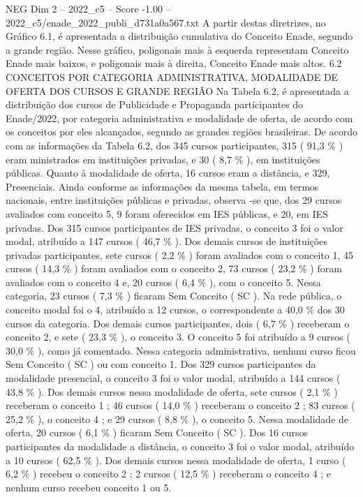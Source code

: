 \begin{textsample}{NEG Dim 2 – 2022\_c5 – Score -1.00 – 2022\_c5/enade\_2022\_publi\_d731a0a567.txt}
A partir destas diretrizes, no Gráfico 6.1, é apresentada a distribuição cumulativa do Conceito Enade, segundo a grande região.
Nesse gráfico, poligonais mais à esquerda representam Conceito Enade mais baixos, e poligonais mais à direita, Conceito Enade mais altos. 6.2 CONCEITOS POR CATEGORIA ADMINISTRATIVA, MODALIDADE DE OFERTA DOS CURSOS E GRANDE REGIÃO Na Tabela 6.2, é apresentada a distribuição dos cursos de Publicidade e Propaganda participantes do Enade/2022, por categoria administrativa e modalidade de oferta, de acordo com os conceitos por eles alcançados, segundo as grandes regiões brasileiras.
De acordo com as informações da Tabela 6.2, dos 345 cursos participantes, 315 ( 91,3 \% ) eram ministrados em instituições privadas, e 30 ( 8,7 \% ), em instituições públicas.
Quanto à modalidade de oferta, 16 cursos eram a distância, e 329, Presenciais.
Ainda conforme as informações da mesma tabela, em termos nacionais, entre instituições públicas e privadas, observa -se que, dos 29 cursos avaliados com conceito 5, 9 foram oferecidos em IES públicas, e 20, em IES privadas.
Dos 315 cursos participantes de IES privadas, o conceito 3 foi o valor modal, atribuído a 147 cursos ( 46,7 \% ).
Dos demais cursos de instituições privadas participantes, sete cursos ( 2,2 \% ) foram avaliados com o conceito 1, 45 cursos ( 14,3 \% ) foram avaliados com o conceito 2, 73 cursos ( 23,2 \% ) foram avaliados com o conceito 4 e, 20 cursos ( 6,4 \% ), com o conceito 5.
Nessa categoria, 23 cursos ( 7,3 \% ) ficaram Sem Conceito ( SC ).
Na rede pública, o conceito modal foi o 4, atribuído a 12 cursos, o correspondente a 40,0 \% dos 30 cursos da categoria.
Dos demais cursos participantes, dois ( 6,7 \% ) receberam o conceito 2, e sete ( 23,3 \% ), o conceito 3.
O conceito 5 foi atribuído a 9 cursos ( 30,0 \% ), como já comentado.
Nessa categoria administrativa, nenhum curso ficou Sem Conceito ( SC ) ou com conceito 1.
Dos 329 cursos participantes da modalidade presencial, o conceito 3 foi o valor modal, atribuído a 144 cursos ( 43,8 \% ).
Dos demais cursos nessa modalidade de oferta, sete cursos ( 2,1 \% ) receberam o conceito 1 ; 46 cursos ( 14,0 \% ) receberam o conceito 2 ; 83 cursos ( 25,2 \% ), o conceito 4 ; e 29 cursos ( 8,8 \% ), o conceito 5.
Nessa modalidade de oferta, 20 cursos ( 6,1 \% ) ficaram Sem Conceito ( SC ).
Dos 16 cursos participantes da modalidade a distância, o conceito 3 foi o valor modal, atribuído a 10 cursos ( 62,5 \% ).
Dos demais cursos nessa modalidade de oferta, 1 curso ( 6,2 \% ) recebeu o conceito 2 ; 2 cursos ( 12,5 \% ) receberam o conceito 4 ; e nenhum curso recebeu conceito 1 ou 5.

\end{textsample}

